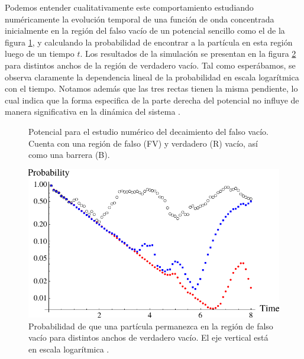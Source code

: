 Podemos entender cualitativamente este comportamiento estudiando numéricamente la evolución temporal de una función de onda concentrada inicialmente en la región del falso vacío de un potencial sencillo como el de la figura \ref{fig:potencial_numerico}, y calculando la probabilidad de encontrar a la partícula en esta región luego de un tiempo $t$. Los resultados de la simulación se presentan en la figura \ref{fig:numerico} para distintos anchos de la región de verdadero vacío. Tal como esperábamos, se observa claramente la dependencia lineal de la probabilidad en escala logarítmica con el tiempo. Notamos además que las tres rectas tienen la misma pendiente, lo cual indica que la forma especifica de la parte derecha del potencial no influye de manera significativa en la dinámica del sistema \cite{paranjape2017theory}. 

\begin{figure}[h]
	\centering
	\caption{Potencial para el estudio numérico del decaimiento del falso vacío. Cuenta con una región de falso (FV) y verdadero (R) vacío, así como una barrera (B).}
	\label{fig:potencial_numerico}
\end{figure}

\begin{figure}
	\centering
	\includegraphics[scale = 0.4]{FIGURAS/numerico}
	\caption{Probabilidad de que una partícula permanezca en la región de falso vacío para distintos anchos de verdadero vacío. El eje vertical está en escala logarítmica \cite{Masoumi:2015psa}.}
	\label{fig:numerico}
\end{figure}

